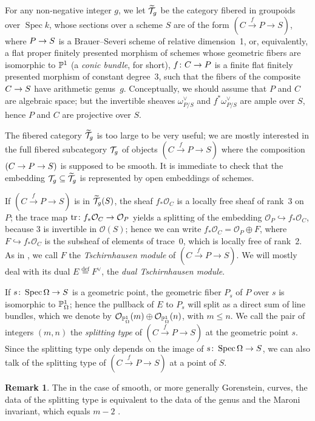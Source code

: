 \documentclass{amsart}
\numberwithin{equation}{section}
\numberwithin{subsection}{section}
\theoremstyle{definition}
\newtheorem{remark}[theorem]{Remark}
\theoremstyle{remark}
\newcommand\cO{\mathcal{O}} \newcommand\cP{\mathcal{P}}
\newcommand\arr{\ifinner\to\else\longrightarrow\fi}
\newcommand{\xarr}{\xrightarrow}
\newcommand\eqdef{\overset{\mathrm{\scriptscriptstyle def}} =}
\newcommand\into{\hookrightarrow}
\newcommand\spec{\operatorname{Spec}}
\newcommand{\tr}{\operatorname{tr}}
\newcommand{\T}[1][g]{\cT_{#1}}
\newcommand{\Tbig}[1][g]{\widetilde{\cT}_{#1}}
\newcommand{\tsch}{Tschirnhausen\xspace}
\newcommand{\dual}{^{\vee}}
\begin{document}
For any non-negative integer $g$, we let $\Tbig$ be the category fibered in groupoids over  $\spec k$, whose sections over a scheme $S$ are of the form $(C \xarr{f} P \to S)$, where $P \arr S$ is a Brauer--Severi scheme of relative dimension~1, or, equivalently, a flat proper finitely presented morphism of schemes whose geometric fibers are isomorphic to $\mathbb{P}^{1}$ (a \emph{conic bundle}, for short), $f\colon C \arr P$ is a finite flat finitely presented morphism of constant degree~$3$, such that the fibers of the composite $C \arr S$ have arithmetic genus~$g$. Conceptually, we should assume that $P$ and $C$ are algebraic space; but the invertible sheaves $\omega^{\vee}_{P/S}$ and $f^{*}\omega^{\vee}_{P/S}$ are ample over $S$, hence $P$ and $C$ are projective over $S$.

The fibered category $\Tbig$ is too large to be very useful; we are mostly interested in the full fibered subcategory $\T$ of objects $(C \xarr{f} P \to S)$ where the composition $(C \arr P \arr S)$ is supposed to be smooth. It is immediate to check that the embedding $\T \subseteq \Tbig$ is represented by open embeddings of schemes.


If $(C \xarr{f} P \to S)$ is in $\Tbig(S)$, the sheaf $f_{*}\cO_{C}$ is a locally free sheaf of rank~3 on $P$; the trace map $\tr\colon f_{*}\cO_{C} \arr \cO_{P}$ yields a splitting of the embedding $\cO_{P} \into f_{*}\cO_{C}$, because $3$ is invertible in $\cO(S)$; hence we can write $f_{*}\cO_{C} = \cO_{P} \oplus F$, where $F \into f_{*}\cO_{C}$ is the subsheaf of elements of trace~0, which is locally free of rank~2. As in \cite{mir3}, we call $F$ the \emph{\tsch module} of $(C \xarr{f} P \to S)$. We will mostly deal with its dual $E \eqdef F\dual$, the \emph{dual \tsch module}.

If $s\colon \spec \Omega \arr S$ is a geometric point, the geometric fiber $P_{s}$ of $P$ over $s$ is isomorphic to $\mathbb{P}^{1}_{\Omega}$; hence the pullback of $E$ to $P_{s}$ will split as a direct sum of line bundles, which we denote by $\cO_{\PP^{1}_{\Omega}}(m) \oplus \cO_{\PP^{1}_{\Omega}}(n)$, with $m \leq n$. We call the pair of integers $(m,n)$ the \emph{splitting type} of $(C \xarr{f} P \to S)$ at the geometric point $s$. Since the splitting type only depends on the image of $s\colon \spec \Omega \arr S$, we can also talk of the splitting type of $(C \xarr{f} P \to S)$ at a point of $S$.

\begin{remark}
The in the case of smooth, or more generally Gorenstein, curves, the data of the splitting type is equivalent to the data of the genus and the Maroni invariant, which equals $m-2$ \cite{maroni, rosa-storh}.
\end{remark}
\end{document}
